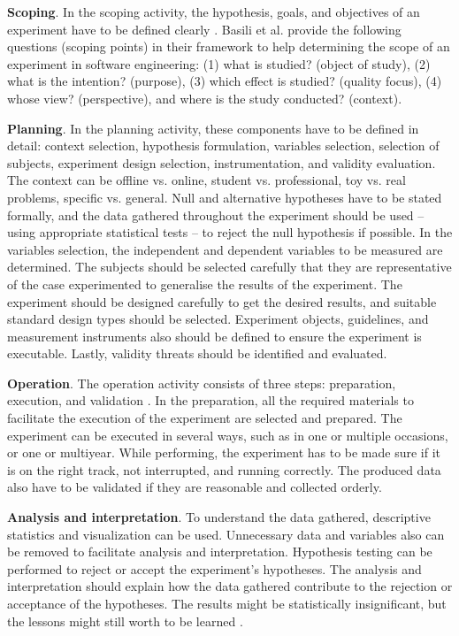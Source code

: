 \textbf{Scoping}. In the scoping activity, the hypothesis, goals, and objectives of an experiment have to be defined clearly \cite{DBLP:books/daglib/0029933/Wohlin}. Basili et al. \cite{basili1988tame} provide the following questions (scoping points) in their framework to help determining the scope of an experiment in software engineering: (1) what is studied? (object of study), (2) what is the intention? (purpose), (3) which effect is studied? (quality focus), (4) whose view? (perspective), and where is the study conducted? (context).

\textbf{Planning}. In the planning activity, these components have to be defined in detail: context selection, hypothesis formulation, variables selection, selection of subjects, experiment design selection, instrumentation, and validity evaluation\cite{DBLP:books/daglib/0029933/Wohlin}. The context can be offline vs. online, student vs. professional, toy vs. real problems, specific vs. general. Null and alternative hypotheses have to be stated formally, and the data gathered throughout the experiment should be used -- using appropriate statistical tests -- to reject the null hypothesis if possible. In the variables selection, the independent and dependent variables to be measured are determined. The subjects should be selected carefully that they are representative of the case experimented to generalise the results of the experiment. The experiment should be designed carefully to get the desired results, and suitable standard design types should be selected. Experiment objects, guidelines, and measurement instruments also should be defined to ensure the experiment is executable. Lastly, validity threats should be identified and evaluated.

\textbf{Operation}. The operation activity consists of three steps: preparation, execution, and validation \cite{DBLP:books/daglib/0029933/Wohlin}. 
In the preparation, all the required materials to facilitate the execution of the experiment are selected and prepared. The experiment can be executed in several ways, such as in one or multiple occasions, or one or multiyear.  While performing, the experiment has to be made sure if it is on the right track, not interrupted, and running correctly. The produced data also have to be validated if they are reasonable and collected orderly.

\textbf{Analysis and interpretation}.
To understand the data gathered, descriptive statistics and visualization can be used. Unnecessary data and variables also can be removed to facilitate analysis and interpretation. Hypothesis testing can be performed to reject or accept the experiment's hypotheses. The analysis and interpretation should explain how the data gathered contribute to the rejection or acceptance of the hypotheses. The results might be statistically insignificant, but the lessons might still worth to be learned \cite{DBLP:books/daglib/0029933/Wohlin}. 

